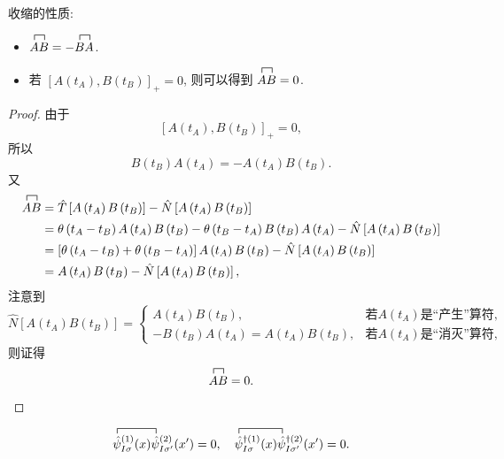 收缩的性质:
\begin{itemize} 
\item $\contraction[1ex]{}{A}{}{B}AB=-\contraction{}{B}{}{A}BA$.
\item 若 $\left[A\left(t_{A}\right), B\left(t_{B}\right)\right]_{+}=0 $, 则可以得到 $\contraction[1ex]{}{A}{}{B}AB =0$.
\end{itemize}
\begin{proof}
由于
\begin{equation}\left[A\left(t_{A}\right), B\left(t_{B}\right)\right]_{+}=0 ,\end{equation}
所以
\begin{equation}B\left(t_{B}\right) A\left(t_{A}\right)=-A\left(t_{A}\right) B\left(t_{B}\right).\end{equation}
又
\begin{align}
\contraction[1ex]{}{A}{}{B}AB &=\hat{T}\left[A\left(t_{A}\right) B\left(t_{B}\right)\right]-\hat{N}\left[A\left(t_{A}\right) B\left(t_{B}\right)\right]\nonumber \\
&=\theta\left(t_{A}-t_{B}\right) A\left(t_{A}\right) B\left(t_{B}\right)-\theta\left(t_{B}-t_{A}\right) B\left(t_{B}\right) A\left(t_{A}\right)-\hat{N}\left[A\left(t_{A}\right) B\left(t_{B}\right)\right] \nonumber\\
&=\left[\theta\left(t_{A}-t_{B}\right)+\theta\left(t_{B}-t_{A}\right)\right] A\left(t_{A}\right) B\left(t_{B}\right)-\hat{N}\left[A\left(t_{A}\right) B\left(t_{B}\right)\right] \nonumber\\
&=A\left(t_{A}\right) B\left(t_{B}\right)-\hat{N}\left[A\left(t_{A}\right) B\left(t_{B}\right)\right],
\end{align}
注意到
\begin{equation}
\hat{N}\left[A\left(t_{A}\right) B\left(t_{B}\right)\right]=\begin{cases}A\left(t_{A}\right) B\left(t_{B}\right), &\text{若} A\left(t_{A}\right) \text{是“产生”算符,} \\
-B\left(t_{B}\right) A\left(t_{A}\right)=A\left(t_{A}\right) B\left(t_{B}\right), &\text{若} A\left(t_{A}\right) \text{是“消灭”算符,}
\end{cases}
\end{equation}
则证得
\begin{equation}\contraction[1ex]{}{A}{}{B}AB =0.\end{equation}
\end{proof}

\begin{corollary}{}{}
\begin{equation}
\contraction{}{\hat{\psi}}{_{I \sigma}^{(1)}(x)}{\hat{\psi}}
\hat{\psi}_{I \sigma}^{(1)}(x)\hat{\psi}_{I \sigma^{\prime}}^{(2)}(x')=0, 
\quad
\contraction{}{\hat{\psi}}{_{I \sigma}^{\dagger(1)}(x)}{\hat{\psi}}
\hat{\psi}_{I \sigma}^{\dagger(1)}(x)\hat{\psi}_{I \sigma^{\prime}}^{\dagger(2)}(x^{\prime})=0.
\end{equation}
\end{corollary}

